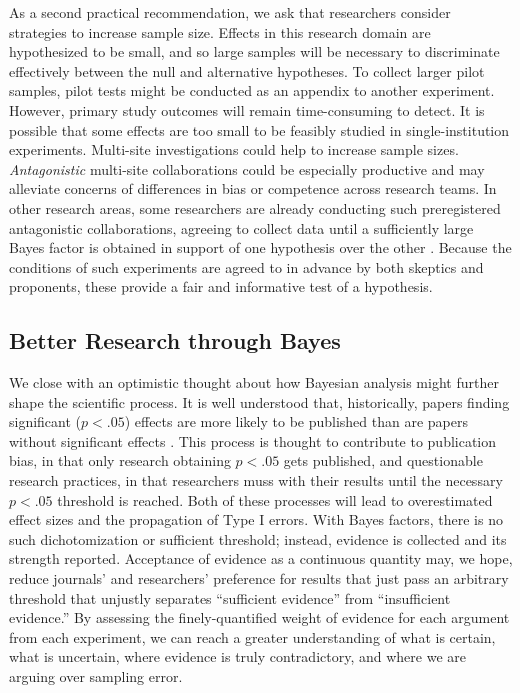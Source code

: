 \documentclass[man]{apa6}
\begin{document}
As a second practical recommendation, we ask that researchers consider strategies to increase sample size. Effects in this research domain are hypothesized to be small, and so large samples will be necessary to discriminate effectively between the null and alternative hypotheses. To collect larger pilot samples, pilot tests might be conducted as an appendix to another experiment. However, primary study outcomes will remain time-consuming to detect. It is possible that some effects are too small to be feasibly studied in single-institution experiments. Multi-site investigations could help to increase sample sizes. {\em Antagonistic} multi-site collaborations could be especially productive and may alleviate concerns of differences in bias or competence across research teams. 
In other research areas, some researchers are already conducting such preregistered antagonistic collaborations, agreeing to collect data until a sufficiently large Bayes factor is obtained in support of one hypothesis over the other \citep[e.g.,][]{Matzke:etal:2015}. Because the conditions of such experiments are agreed to in advance by both skeptics and proponents, these provide a fair and informative test of a hypothesis.

\subsection{Better Research through Bayes}
We close with an optimistic thought about how Bayesian analysis might further shape the scientific process. It is well understood that, historically, papers finding significant ($p < .05$) effects are more likely to be published than are papers without significant effects \citep{Atkinson:etal:1982,Cooper:etal:1997,McDaniel:etal:2006}. 
This process is thought to contribute to publication bias, in that only research obtaining $p<.05$ gets published, and questionable research practices, in that researchers muss with their results until the necessary $p < .05$ threshold is reached. Both of these processes will lead to overestimated effect sizes and the propagation of Type I errors. 
With Bayes factors, there is no such dichotomization or sufficient threshold; instead, evidence is collected and its strength reported. Acceptance of evidence as a continuous quantity may, we hope, reduce journals' and researchers' preference for results that just pass an arbitrary threshold that unjustly separates ``sufficient evidence'' from ``insufficient evidence.'' By assessing the finely-quantified weight of evidence for each argument from each experiment, we can reach a greater understanding of what is certain, what is uncertain, where evidence is truly contradictory, and where we are arguing over sampling error.
\end{document}
